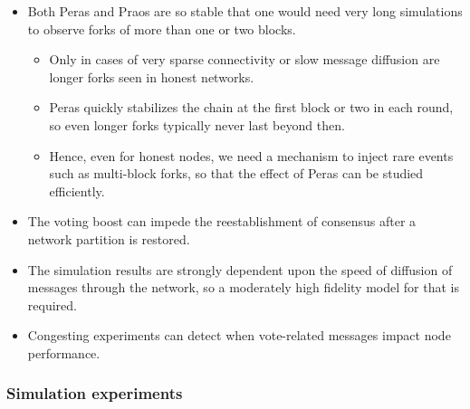 \documentclass[10pt]{article}
\providecommand{\tightlist}{%
  \setlength{\itemsep}{0pt}\setlength{\parskip}{0pt}}
\begin{document}
\begin{itemize}
\tightlist
\item
  Both Peras and Praos are so stable that one would need very long
  simulations to observe forks of more than one or two blocks.

  \begin{itemize}
  \tightlist
  \item
    Only in cases of very sparse connectivity or slow message diffusion
    are longer forks seen in honest networks.
  \item
    Peras quickly stabilizes the chain at the first block or two in each
    round, so even longer forks typically never last beyond then.
  \item
    Hence, even for honest nodes, we need a mechanism to inject rare
    events such as multi-block forks, so that the effect of Peras can be
    studied efficiently.
  \end{itemize}
\item
  The voting boost can impede the reestablishment of consensus after a
  network partition is restored.
\item
  The simulation results are strongly dependent upon the speed of
  diffusion of messages through the network, so a moderately high
  fidelity model for that is required.
\item
  Congesting experiments can detect when vote-related messages impact
  node performance.
\end{itemize}

\subsubsection{Simulation experiments}\label{simulation-experiments}
\end{document}
